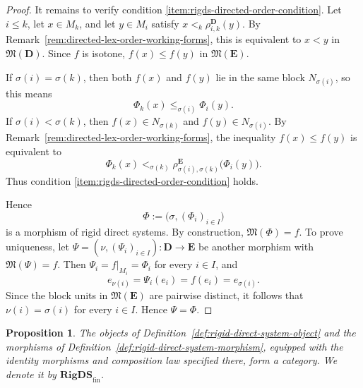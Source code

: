 \documentclass[pdflatex,sn-mathphys-num]{sn-jnl}
\theoremstyle{thmstyleone}%
\newtheorem{proposition}[theorem]{Proposition}
\theoremstyle{thmstyletwo}%
\theoremstyle{thmstylethree}%
\begin{document}
\begin{proof}
It remains to verify condition \ref{item:rigds-directed-order-condition}.
Let \(i\le k\), let \(x\in M_k\), and let \(y\in M_i\) satisfy \(x<_k\rho^{\mathbf D}_{i,k}(y)\).
By Remark~\ref{rem:directed-lex-order-working-forms}, this is equivalent to \(x<y\) in \(\mathfrak M(\mathbf D)\).
Since \(f\) is isotone, \(f(x)\le f(y)\) in \(\mathfrak M(\mathbf E)\).

If \(\sigma(i)=\sigma(k)\), then both \(f(x)\) and \(f(y)\) lie in the same block \(N_{\sigma(i)}\), so this means
\[
\Phi_k(x)\le_{\sigma(i)}\Phi_i(y).
\]
If \(\sigma(i)<\sigma(k)\), then \(f(x)\in N_{\sigma(k)}\) and \(f(y)\in N_{\sigma(i)}\).
By Remark~\ref{rem:directed-lex-order-working-forms}, the inequality \(f(x)\le f(y)\) is equivalent to
\[
\Phi_k(x)<_{\sigma(k)}
\rho^{\mathbf E}_{\sigma(i),\sigma(k)}\!\bigl(\Phi_i(y)\bigr).
\]
Thus condition \ref{item:rigds-directed-order-condition} holds.

Hence
\[
\Phi:=\bigl(\sigma,(\Phi_i)_{i\in I}\bigr)
\]
is a morphism of rigid direct systems.
By construction, \(\mathfrak M(\Phi)=f\).
To prove uniqueness, let \(\Psi=(\nu,(\Psi_i)_{i\in I})\colon \mathbf D\to \mathbf E\) be another morphism with \(\mathfrak M(\Psi)=f\).
Then \(\Psi_i=f|_{M_i}=\Phi_i\) for every \(i\in I\), and
\[
e_{\nu(i)}
=
\Psi_i(e_i)
=
f(e_i)
=
e_{\sigma(i)}.
\]
Since the block units in \(\mathfrak M(\mathbf E)\) are pairwise distinct, it follows that \(\nu(i)=\sigma(i)\) for every \(i\in I\).
Hence \(\Psi=\Phi\).
\end{proof}

\begin{proposition}\label{prop:rigds-category}
The objects of Definition~\ref{def:rigid-direct-system-object} and the morphisms of Definition~\ref{def:rigid-direct-system-morphism}, equipped with the identity morphisms and composition law specified there, form a category.
We denote it by \(\mathbf{RigDS}_{\mathrm{fin}}\).
\end{proposition}
\end{document}
